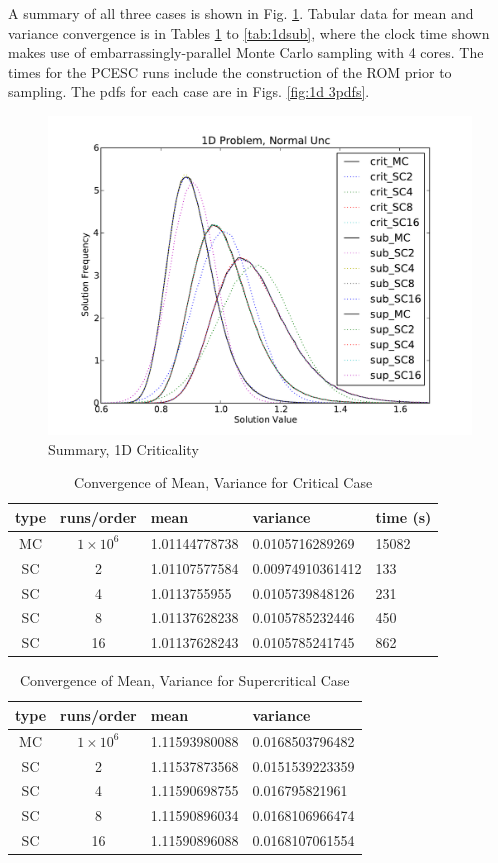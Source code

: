 A summary of all three cases is shown in Fig. \ref{1d_all}.  Tabular data for mean and variance convergence is in Tables \ref{tab:1dcrit} to \ref{tab:1dsub}, where the clock time shown makes use of embarrassingly-parallel Monte Carlo sampling with 4 cores.  The times for the PCESC runs include the construction of the ROM prior to sampling.  The pdfs for each case are in Figs. \ref{fig:1d 3pdfs}.  

\begin{figure}[h!]
\centering
   \includegraphics[width=.75\textwidth]{../graphics/1dall_normal_pdfs}
   \caption{Summary, 1D Criticality}
   \label{1d_all}
\end{figure}

\begin{table}
\begin{center}
\begin{tabular}{c c|l l l}
type & runs/order & mean & variance & time (s) \\ \hline
MC & $1\times10^6$ & 1.01144778738 & 0.0105716289269 & 15082  \\
SC & 2 & 1.01107577584 & 0.00974910361412 & 133 \\
SC & 4 & 1.0113755955 & 0.0105739848126 & 231\\
SC & 8 & 1.01137628238 & 0.0105785232446 & 450\\
SC & 16 & 1.01137628243 & 0.0105785241745 & 862
\end{tabular}
\end{center}
\caption{Convergence of Mean, Variance for Critical Case}
\label{tab:1dcrit}
\end{table}

\begin{table}
\begin{center}
\begin{tabular}{c c|l l}
type & runs/order & mean & variance \\ \hline
MC & $1\times10^6$ & 1.11593980088 & 0.0168503796482 \\
SC & 2 & 1.11537873568 & 0.0151539223359 \\
SC & 4 & 1.11590698755 & 0.016795821961\\
SC & 8 & 1.11590896034 & 0.0168106966474 \\
SC & 16 & 1.11590896088 & 0.0168107061554
\end{tabular}
\end{center}
\caption{Convergence of Mean, Variance for Supercritical Case}
\label{tab:1dsup}
\end{table}

